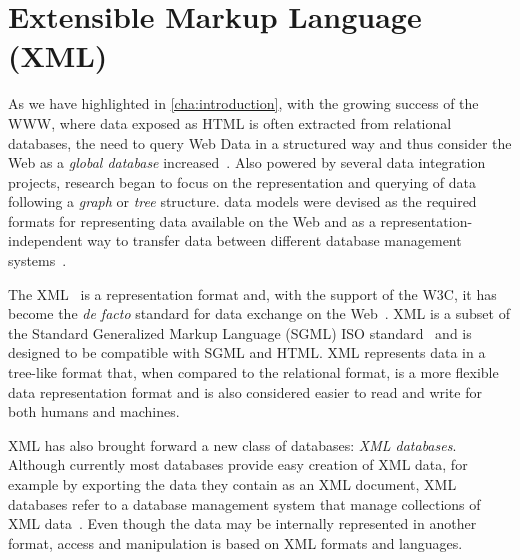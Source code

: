 \section{Extensible Markup Language (XML)}
\label{sec:xml}


As we have highlighted in \cref{cha:introduction}, with the growing success of the \ac{WWW}, where data exposed as
\ac{HTML} is often extracted from relational databases, the need to query Web Data in a structured way and thus consider
the Web as a \emph{global database} increased~\cite{SilberschatzKorthSudarshan:2005aa,AbiteboulBunemanSuciu:1999aa}.
%
Also powered by several data integration projects, research began to focus on the representation and querying of
\sd data following a \emph{graph} or \emph{tree} structure.
%
\Sd data models were devised as the required formats for representing data available on the Web and as a
representation-independent way to transfer data between different database management
systems~\cite{Abiteboul:1997aa,Buneman:1997aa}.

The \acf{XML}~\cite{BrayPaoliSperberg-Mcqueen:2008aa} is a \sd representation format and, with the support of the
\ac{W3C}, it has become the \emph{de facto} standard for data exchange on the
Web~\cite{Suciu:1998aa,AbiteboulBunemanSuciu:1999aa}.  XML is a subset of the Standard Generalized Markup Language
(SGML) ISO standard~\cite{ISO:1986:SGML} and is designed to be compatible with SGML and \ac{HTML}.
%
\ac{XML} represents data in a tree-like format that, when compared to the relational format, is a more flexible data
representation format and is also considered easier to read and write for both humans and machines.


\ac{XML} has also brought forward a new class of databases: \emph{XML databases}.  Although currently most databases
provide easy creation of \ac{XML} data, for example by exporting the data they contain as an \ac{XML} document, \ac{XML}
databases refer to a database management system that manage collections of \ac{XML}
data~\cite{KatzChamberlinKay:2003aa}.  Even though the data may be internally represented in another format, access and
manipulation is based on \ac{XML} formats and languages.


